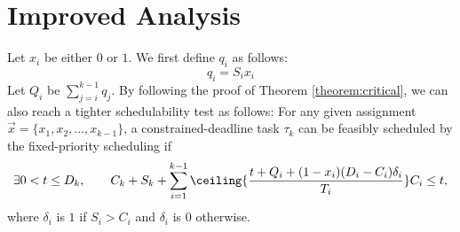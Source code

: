 \section{Improved Analysis}

Let $x_i$ be either $0$ or $1$. We first define $q_i$ as follows:
\begin{equation}
  \label{eq:qi}
  q_i = S_i x_i
\end{equation}
Let $Q_i$ be $\sum_{j=i}^{k-1} q_j$.  
By following the proof of Theorem \ref{theorem:critical}, we can also reach a tighter schedulability test as follows: For any given assignment $\vec{x} = \{x_1, x_2, \ldots, x_{k-1}\}$, a constrained-deadline task $\tau_k$ can be feasibly scheduled by the fixed-priority scheduling if
\begin{equation} \label{eq:TDA-suspension-tighter} 
\exists 0 < t \leq D_k, \qquad C_k+S_k+ \sum_{i=1}^{k-1}\ceiling{\frac{t+Q_i+(1-x_i)(D_i-C_i)\delta_i}{T_i}} C_i \leq t,
\end{equation}
where $\delta_i$ is $1$ if $S_i > C_i$ and $\delta_i$ is $0$ otherwise.
  
  
  
  
  
  
  
  
  
  
  
  
  
  
  